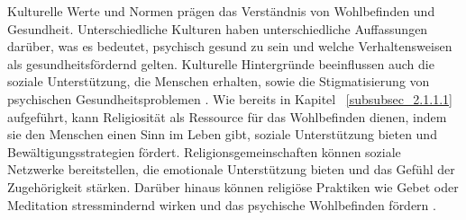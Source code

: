 Kulturelle Werte und Normen prägen das Verständnis von Wohlbefinden und Gesundheit. Unterschiedliche Kulturen haben unterschiedliche Auffassungen darüber, was es bedeutet, psychisch gesund zu sein und welche Verhaltensweisen als gesundheitsfördernd gelten. Kulturelle Hintergründe beeinflussen auch die soziale Unterstützung, die Menschen erhalten, sowie die Stigmatisierung von psychischen Gesundheitsproblemen \parencite{Triandis1994}. Wie bereits in Kapitel ~\ref{subsubsec_2.1.1.1} aufgeführt, kann Religiosität als Ressource für das Wohlbefinden dienen, indem sie den Menschen einen Sinn im Leben gibt, soziale Unterstützung bieten und Bewältigungsstrategien fördert. Religionsgemeinschaften können soziale Netzwerke bereitstellen, die emotionale Unterstützung bieten und das Gefühl der Zugehörigkeit stärken. Darüber hinaus können religiöse Praktiken wie Gebet oder Meditation stressmindernd wirken und das psychische Wohlbefinden fördern \parencite{Koenig2012, Pargament1997}.







